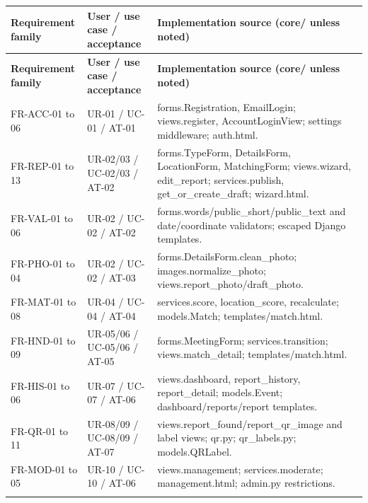 \documentclass[12pt,a4paper,oneside]{report}
\begin{document}
\begin{longtable}{@{}P{0.24\dimexpr\textwidth-24pt\relax}P{0.27\dimexpr\textwidth-24pt\relax}P{0.49\dimexpr\textwidth-24pt\relax}@{}}

\toprule \textbf{Requirement family} & \textbf{User / use case / acceptance} & \textbf{Implementation source (core/ unless noted)} \\ \midrule\endfirsthead

\toprule \textbf{Requirement family} & \textbf{User / use case / acceptance} & \textbf{Implementation source (core/ unless noted)} \\ \midrule\endhead

\bottomrule\endfoot

FR-ACC-01 to 06 & UR-01 / UC-01 / AT-01 & forms.Registration, EmailLogin; views.register, AccountLoginView; settings middleware; auth.html. \\ \addlinespace[3pt]

FR-REP-01 to 13 & UR-02/03 / UC-02/03 / AT-02 & forms.TypeForm, DetailsForm, LocationForm, MatchingForm; views.wizard, edit\_report; services.publish, get\_or\_create\_draft; wizard.html. \\ \addlinespace[3pt]

FR-VAL-01 to 06 & UR-02 / UC-02 / AT-02 & forms.words/public\_short/public\_text and date/coordinate validators; escaped Django templates. \\ \addlinespace[3pt]

FR-PHO-01 to 04 & UR-02 / UC-02 / AT-03 & forms.DetailsForm.clean\_photo; images.normalize\_photo; views.report\_photo/draft\_photo. \\ \addlinespace[3pt]

FR-MAT-01 to 08 & UR-04 / UC-04 / AT-04 & services.score, location\_score, recalculate; models.Match; templates/match.html. \\ \addlinespace[3pt]

FR-HND-01 to 09 & UR-05/06 / UC-05/06 / AT-05 & forms.MeetingForm; services.transition; views.match\_detail; templates/match.html. \\ \addlinespace[3pt]

FR-HIS-01 to 06 & UR-07 / UC-07 / AT-06 & views.dashboard, report\_history, report\_detail; models.Event; dashboard/reports/report templates. \\ \addlinespace[3pt]

FR-QR-01 to 11 & UR-08/09 / UC-08/09 / AT-07 & views.report\_found/report\_qr\_image and label views; qr.py; qr\_labels.py; models.QRLabel. \\ \addlinespace[3pt]

FR-MOD-01 to 05 & UR-10 / UC-10 / AT-06 & views.management; services.moderate; management.html; admin.py restrictions. \\ \addlinespace[3pt]

\end{longtable}
\end{document}
